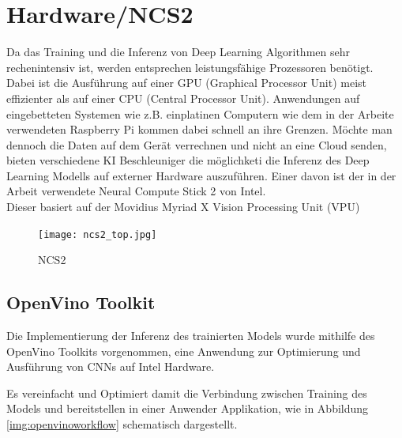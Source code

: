 \section{Hardware/NCS2}\label{sec:hardware}

Da das Training und die Inferenz von Deep Learning Algorithmen
 sehr rechenintensiv ist, werden entsprechen leistungsfähige 
Prozessoren benötigt. Dabei ist die Ausführung auf einer GPU 
(Graphical Processor Unit) meist effizienter als auf einer 
CPU (Central Processor Unit). Anwendungen auf eingebetteten Systemen
wie z.B. einplatinen Computern wie dem in der Arbeite verwendeten
Raspberry Pi kommen dabei schnell an ihre Grenzen.
Möchte man dennoch die Daten auf dem Gerät verrechnen und 
nicht an eine Cloud senden, bieten verschiedene KI Beschleuniger 
die möglichketi die Inferenz des Deep Learning Modells 
auf externer Hardware auszuführen. Einer davon ist der in der 
Arbeit verwendete Neural Compute Stick 2 von Intel.
\\
Dieser basiert auf der Movidius Myriad X Vision Processing Unit (VPU)
\cite{haussermannFunktionUndEffizienz}

\begin{figure}[htb]
    \centering
    \label{fig:ncs2}
    \texttt{[image: ncs2\_top.jpg]}
    \caption{NCS2}
\end{figure}

\subsection{OpenVino Toolkit}



Die Implementierung der Inferenz des trainierten Models wurde 
mithilfe des OpenVino Toolkits vorgenommen, eine Anwendung 
zur Optimierung und Ausführung von CNNs auf Intel Hardware.

Es vereinfacht und Optimiert damit die Verbindung zwischen 
Training des Models und bereitstellen in einer Anwender 
Applikation, wie in Abbildung \ref{img:openvinoworkflow} 
schematisch dargestellt.

